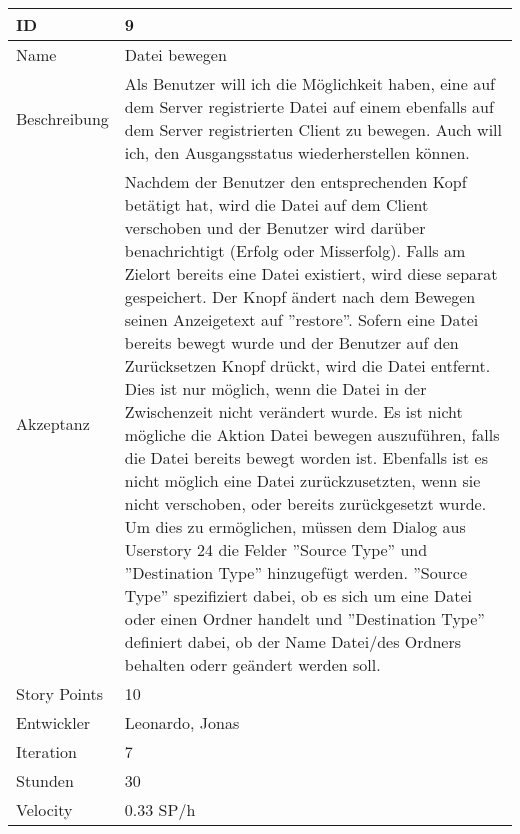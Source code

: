 \begin{table}[htbp]
    \begin{minipage}{\linewidth}
        \setlength{\tymax}{0.5\linewidth}
        \centering
        \small
        \begin{tabulary}{\textwidth}{|l|p{10cm}|} \hline
            ID   &9\\\hline
            Name  &Datei bewegen\\\hline
	    Beschreibung&Als Benutzer will ich die Möglichkeit haben, eine auf dem Server registrierte Datei auf einem ebenfalls auf dem Server registrierten Client zu bewegen. 
	    Auch will ich, den Ausgangsstatus wiederherstellen können.\\\hline
            Akzeptanz &Nachdem der Benutzer den entsprechenden Kopf betätigt hat, wird die Datei auf dem Client verschoben und der Benutzer wird darüber benachrichtigt (Erfolg oder Misserfolg). Falls am Zielort bereits eine Datei existiert, wird diese separat gespeichert. Der Knopf ändert nach dem Bewegen seinen Anzeigetext auf ''restore''. Sofern eine Datei bereits bewegt wurde und der Benutzer auf den Zurücksetzen Knopf drückt, wird die Datei entfernt. Dies ist nur möglich, wenn die Datei in der Zwischenzeit nicht verändert wurde. Es ist nicht mögliche die Aktion Datei bewegen auszuführen, falls die Datei bereits bewegt worden ist. Ebenfalls ist es nicht möglich eine Datei zurückzusetzten, wenn sie nicht verschoben, oder bereits zurückgesetzt wurde.
	    Um dies zu ermöglichen, müssen dem Dialog aus Userstory 24 die Felder ''Source Type'' und ''Destination Type'' hinzugefügt werden. ''Source Type'' spezifiziert dabei, ob es sich um eine Datei oder einen Ordner handelt und ''Destination Type'' definiert dabei, ob der Name Datei/des Ordners behalten oderr geändert werden soll.\\\hline
            Story Points&10\\\hline
            Entwickler &Leonardo, Jonas\\\hline
            Iteration &7\\\hline
            Stunden  &30\\\hline
            Velocity &0.33 SP\slash h\\\hline
        \end{tabulary}
    \end{minipage}
\end{table}



